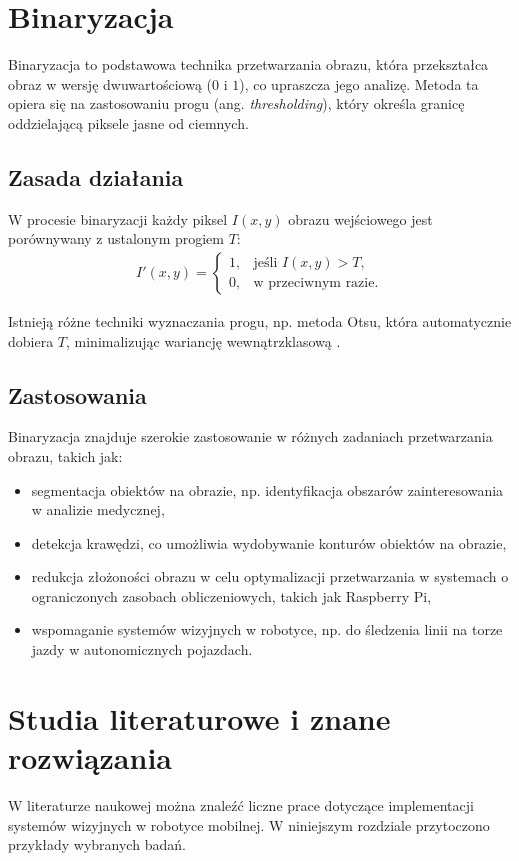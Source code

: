 \documentclass[a4paper,twoside,12pt]{book}
\begin{document}
\section{Binaryzacja}
Binaryzacja to podstawowa technika przetwarzania obrazu, która przekształca obraz w wersję dwuwartościową (\(0\) i \(1\)), co upraszcza jego analizę. Metoda ta opiera się na zastosowaniu progu (ang. \textit{thresholding}), który określa granicę oddzielającą piksele jasne od ciemnych.

\subsection{Zasada działania}
W procesie binaryzacji każdy piksel \( I(x, y) \) obrazu wejściowego jest porównywany z ustalonym progiem \( T \):
\begin{align}
    I'(x, y) =
    \begin{cases} 
        1, & \text{jeśli } I(x, y) > T, \\
        0, & \text{w przeciwnym razie}.
    \end{cases}
\end{align}

Istnieją różne techniki wyznaczania progu, np. metoda Otsu, która automatycznie dobiera \( T \), minimalizując wariancję wewnątrzklasową \cite{bib:huang2012improved}.
\newpage
\subsection{Zastosowania}
Binaryzacja znajduje szerokie zastosowanie w różnych zadaniach przetwarzania obrazu, takich jak:
\begin{itemize}
    \item segmentacja obiektów na obrazie, np. identyfikacja obszarów zainteresowania w analizie medycznej,
    \item detekcja krawędzi, co umożliwia wydobywanie konturów obiektów na obrazie,
    \item redukcja złożoności obrazu w celu optymalizacji przetwarzania w systemach o ograniczonych zasobach obliczeniowych, takich jak Raspberry Pi,
    \item wspomaganie systemów wizyjnych w robotyce, np. do śledzenia linii na torze jazdy w autonomicznych pojazdach.
\end{itemize}
\newpage
\section{Studia literaturowe i znane rozwiązania}
W literaturze naukowej można znaleźć liczne prace dotyczące implementacji systemów wizyjnych w robotyce mobilnej. W niniejszym rozdziale przytoczono przykłady wybranych badań.
\end{document}
